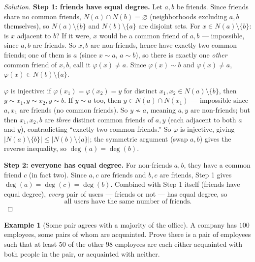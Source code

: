 \documentclass[11pt]{article}
\theoremstyle{definition}
\newtheorem{example}{Example}[section]
\begin{document}
\begin{proof}[Solution]
\textbf{Step 1: friends have equal degree.} Let $a,b$ be friends. Since friends share no common friends, $N(a)\cap N(b)=\varnothing$ (neighborhoods excluding $a,b$ themselves), so $N(a)\setminus\{b\}$ and $N(b)\setminus\{a\}$ are disjoint sets. For $x\in N(a)\setminus\{b\}$: is $x$ adjacent to $b$? If it were, $x$ would be a common friend of $a,b$ — impossible, since $a,b$ are friends. So $x,b$ are non-friends, hence have exactly two common friends; one of them is $a$ (since $x\sim a$, $a\sim b$), so there is exactly one \emph{other} common friend of $x,b$, call it $\varphi(x)\neq a$. Since $\varphi(x)\sim b$ and $\varphi(x)\neq a$, $\varphi(x)\in N(b)\setminus\{a\}$.

$\varphi$ is injective: if $\varphi(x_1)=\varphi(x_2)=y$ for distinct $x_1,x_2\in N(a)\setminus\{b\}$, then $y\sim x_1,y\sim x_2,y\sim b$. If $y\sim a$ too, then $y\in N(a)\cap N(x_1)$ — impossible since $a,x_1$ are friends (no common friends). So $y\not\sim a$, meaning $a,y$ are non-friends; but then $x_1,x_2,b$ are \emph{three} distinct common friends of $a,y$ (each adjacent to both $a$ and $y$), contradicting ``exactly two common friends.'' So $\varphi$ is injective, giving $|N(a)\setminus\{b\}|\le|N(b)\setminus\{a\}|$; the symmetric argument (swap $a,b$) gives the reverse inequality, so $\deg(a)=\deg(b)$.

\textbf{Step 2: everyone has equal degree.} For non-friends $a,b$, they have a common friend $c$ (in fact two). Since $a,c$ are friends and $b,c$ are friends, Step 1 gives $\deg(a)=\deg(c)=\deg(b)$. Combined with Step 1 itself (friends have equal degree), \emph{every} pair of users — friends or not — has equal degree, so
\[
\boxed{\text{all users have the same number of friends}}.
\]
\end{proof}

\begin{example}[Some pair agrees with a majority of the office]
A company has $100$ employees, some pairs of whom are acquainted. Prove there is a pair of employees such that at least $50$ of the other $98$ employees are each either acquainted with both people in the pair, or acquainted with neither.
\end{example}
\end{document}
